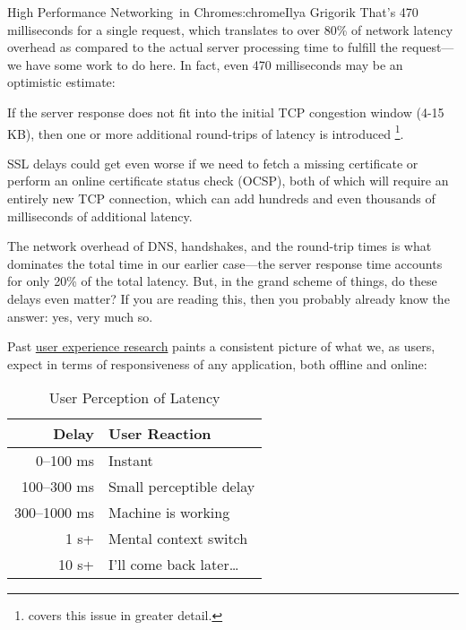 \begin{aosachapter}{High Performance Networking~in Chrome}{s:chrome}{Ilya Grigorik}
That's 470 milliseconds for a single request, which translates to over
80\% of network latency overhead as compared to the actual server
processing time to fulfill the request---we have some work to do here.
In fact, even 470 milliseconds may be an optimistic estimate:

\begin{aosaitemize}

\item
  If the server response does not fit into the initial TCP congestion
  window (4-15 KB), then one or more additional round-trips of latency
  is introduced \footnote{ covers this issue
    in greater detail.}.
\item
  SSL delays could get even worse if we need to fetch a missing
  certificate or perform an online certificate status check (OCSP), both
  of which will require an entirely new TCP connection, which can add
  hundreds and even thousands of milliseconds of additional latency.
\end{aosaitemize}


The network overhead of DNS, handshakes, and the round-trip times is
what dominates the total time in our earlier case---the server response
time accounts for only 20\% of the total latency. But, in the grand
scheme of things, do these delays even matter? If you are reading this,
then you probably already know the answer: yes, very much so.

Past \href{http://www.useit.com/papers/responsetime.html}{user
experience research} paints a consistent picture of what we, as users,
expect in terms of responsiveness of any application, both offline and
online:

\begin{table}[h!]
\centering
{\footnotesize
{}
\begin{tabular}{rl}
\hline
\textbf{Delay}
& \textbf{User Reaction}
\\
\hline
0--100 ms
& Instant
\\
100--300 ms
& Small perceptible delay
\\
300--1000 ms
& Machine is working
\\
1 s+
& Mental context switch
\\
10 s+
& I'll come back later{\ldots}
\\
\hline
\end{tabular}
}
\caption{User Perception of Latency}
\label{posa.tbl.latencyuser}
\end{table}


\end{aosachapter}
